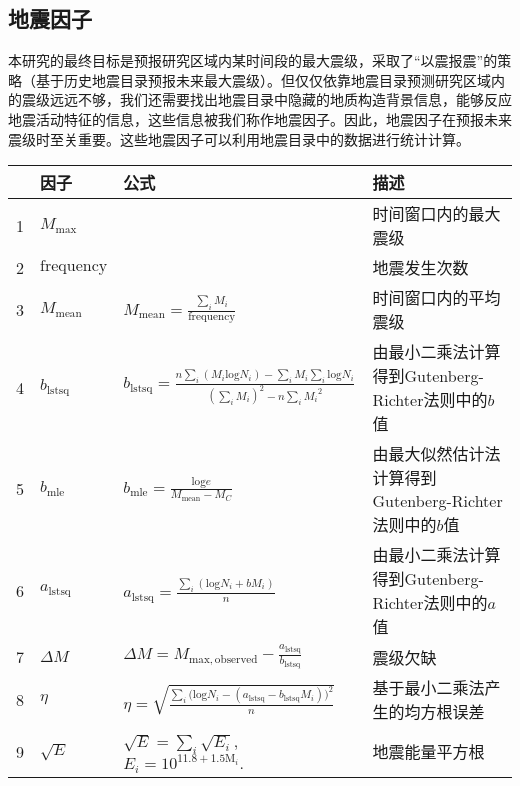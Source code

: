 \subsection{地震因子}\label{sec:seism_indicator}

本研究的最终目标是预报研究区域内某时间段的最大震级，采取了“以震报震”的策略（基于历史地震目录预报未来最大震级）。但仅仅依靠地震目录预测研究区域内的震级远远不够，我们还需要找出地震目录中隐藏的地质构造背景信息，能够反应地震活动特征的信息，这些信息被我们称作地震因子。因此，地震因子在预报未来震级时至关重要。这些地震因子可以利用地震目录中的数据进行统计计算。

\begin{sidewaystable}[htpb]
  \centering
  \label{tab:seism_input_data}
  \footnotesize
  \begin{tabular}{llll}
    \toprule
      & 因子 & 公式 & 描述 \\
    \midrule
    1 & $M_{\mathrm{max}}$ &  & 时间窗口内的最大震级 \\ 
    2 & $\mathrm{frequency}$ &  & 地震发生次数 \\ 
    3 & $M_{\mathrm{mean}}$ & $\displaystyle M_{\mathrm{mean}}=\frac{\sum_i{M_i}}{\mathrm{frequency}}$ & 时间窗口内的平均震级 \\ 
    4 & $b_{\mathrm{lstsq}}$ & $\displaystyle b_{\mathrm{lstsq}}=\frac{n\sum_i{(M_i\mathrm{log} N_i)}-\sum_i{M_i}\sum_i\mathrm{log}N_i}{(\sum_i{M_i})^2-n\sum_i{{M_i}^2}}$ & 由最小二乘法计算得到Gutenberg-Richter法则中的$b$值\\
    5 & $b_{\mathrm{mle}}$ & $\displaystyle b_{\mathrm{mle}}=\frac{\mathrm{log}e}{M_{\mathrm{mean}}-M_C}$ & 由最大似然估计法计算得到Gutenberg-Richter法则中的$b$值 \\ 
    6 & $a_{\mathrm{lstsq}}$ & $\displaystyle a_{\mathrm{lstsq}}=\frac{\sum_i{(\mathrm{log}N_i+bM_i)}}{n}$ & 由最小二乘法计算得到Gutenberg-Richter法则中的$a$值 \\ 
    7 & $\Delta M$ & $\displaystyle \Delta M=M_{\mathrm{max, observed}}- \frac{a_{\mathrm{lstsq}}}{b_{\mathrm{lstsq}}}$ & 震级欠缺 \\ 
    8 & $\eta$ & $\displaystyle \eta=\sqrt{\frac{\sum_i{(\mathrm{log} {N_i}}-(a_{\mathrm{lstsq}}-b_{\mathrm{lstsq}}{M_i}))^2}{n}}$ & 基于最小二乘法产生的均方根误差 \\ 
    9 & $\sqrt{E}$ & $\displaystyle \sqrt{E}=\sum_i{\sqrt{E_i}}$, $\displaystyle E_i=10^{11.8+1.5\mathrm{M}_i}.$ & 地震能量平方根\citep{Last2016predicting,asim2017earthquake}  \\ 

\end{tabular}
\end{sidewaystable}
